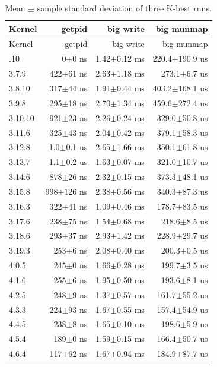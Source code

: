 \begin{longtable}{@{}lrrr@{}}
\caption{Mean $\pm$ sample standard deviation of three K-best runs.}\label{tab:kernels}\\
\toprule
Kernel & getpid & big write & big munmap \\
\midrule
\endfirsthead
\toprule
Kernel & getpid & big write & big munmap \\
\midrule
\endhead
\bottomrule
\endfoot
3.6.10 & 0$\pm$0 ns & 1.42$\pm$0.12 ms & 220.4$\pm$190.9 us \\
3.7.9 & 422$\pm$61 ns & 2.63$\pm$1.18 ms & 273.1$\pm$6.7 us \\
3.8.10 & 317$\pm$44 ns & 1.91$\pm$0.44 ms & 403.2$\pm$168.1 us \\
3.9.8 & 295$\pm$18 ns & 2.70$\pm$1.34 ms & 459.6$\pm$272.4 us \\
3.10.10 & 921$\pm$23 ns & 2.26$\pm$0.24 ms & 329.0$\pm$50.8 us \\
3.11.6 & 325$\pm$43 ns & 2.04$\pm$0.42 ms & 379.1$\pm$58.3 us \\
3.12.8 & 1.0$\pm$0.1 us & 2.65$\pm$1.66 ms & 350.1$\pm$61.8 us \\
3.13.7 & 1.1$\pm$0.2 us & 1.63$\pm$0.07 ms & 321.0$\pm$10.7 us \\
3.14.6 & 878$\pm$26 ns & 2.32$\pm$0.15 ms & 373.3$\pm$48.1 us \\
3.15.8 & 998$\pm$126 ns & 2.38$\pm$0.56 ms & 340.3$\pm$87.3 us \\
3.16.3 & 322$\pm$41 ns & 1.09$\pm$0.46 ms & 178.7$\pm$83.5 us \\
3.17.6 & 238$\pm$75 ns & 1.54$\pm$0.68 ms & 218.6$\pm$8.5 us \\
3.18.6 & 293$\pm$37 ns & 2.93$\pm$1.42 ms & 228.9$\pm$29.7 us \\
3.19.3 & 253$\pm$6 ns & 2.08$\pm$0.40 ms & 200.3$\pm$0.5 us \\
4.0.5 & 245$\pm$0 ns & 1.66$\pm$0.28 ms & 199.7$\pm$3.5 us \\
4.1.6 & 255$\pm$6 ns & 1.95$\pm$0.50 ms & 193.6$\pm$8.1 us \\
4.2.5 & 248$\pm$9 ns & 1.37$\pm$0.57 ms & 161.7$\pm$55.2 us \\
4.3.3 & 224$\pm$93 ns & 1.67$\pm$0.55 ms & 157.4$\pm$54.9 us \\
4.4.5 & 238$\pm$8 ns & 1.65$\pm$0.10 ms & 198.6$\pm$5.9 us \\
4.5.4 & 189$\pm$0 ns & 1.59$\pm$0.15 ms & 166.4$\pm$50.7 us \\
4.6.4 & 117$\pm$62 ns & 1.67$\pm$0.94 ms & 184.9$\pm$87.7 us \\

\end{longtable}
